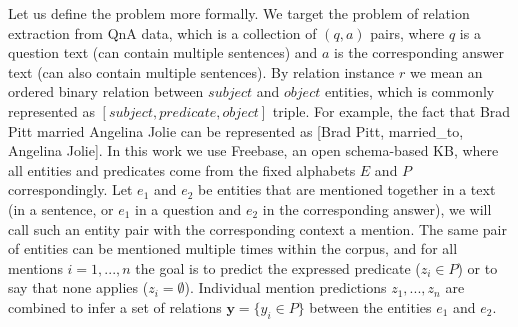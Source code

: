 Let us define the problem more formally.
We target the problem of relation extraction from QnA data, which is a collection of $(q, a)$ pairs, where $q$ is a question text (can contain multiple sentences) and $a$ is the corresponding answer text (can also contain multiple sentences).
By relation instance $r$ we mean an ordered binary relation between $subject$ and $object$ entities, which is commonly represented as $[subject, predicate, object]$ triple.
For example, the fact that Brad Pitt married Angelina Jolie can be represented as [Brad Pitt, married\_to, Angelina Jolie].
In this work we use Freebase, an open schema-based KB, where all entities and predicates come from the fixed alphabets $E$ and $P$ correspondingly.
Let $e_1$ and $e_2$ be entities that are mentioned together in a text (\eg in a sentence, or $e_1$ in a question and $e_2$ in the corresponding answer), we will call such an entity pair with the corresponding context a mention.
The same pair of entities can be mentioned multiple times within the corpus, and for all mentions $i=1,...,n$ the goal is to predict the expressed predicate ($z_i \in P$) or to say that none applies ($z_i = \emptyset$).
Individual mention predictions $z_1, ..., z_n$ are combined to infer a set of relations $\mathbf{y}=\{y_i \in P\}$ between the entities $e_1$ and $e_2$.

